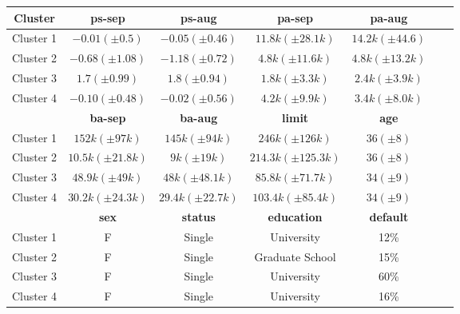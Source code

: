 \begin{center}
\begin{tabular}{c|c|c|c|c|c|c}
	\hline
	\textbf{Cluster} & \textbf{ps-sep} 
	& \textbf{ps-aug} & \textbf{pa-sep} 
	& \textbf{pa-aug}\\
	\hline
	Cluster 1 & 
	$ -0.01 (\pm 0.5)$ & 
	$ -0.05 (\pm 0.46)$ &
	$11.8k (\pm 28.1k)$ &
	$14.2k (\pm 44.6)$\\
	\hline
	Cluster 2 & 
	$-0.68 (\pm 1.08)$ & 
	$-1.18 (\pm 0.72)$ &
	$4.8k (\pm 11.6k)$ &
	$4.8k (\pm 13.2k)$\\
	\hline
	Cluster 3 & 
	$1.7 (\pm 0.99)$ & 
	$1.8 (\pm 0.94)$ &
	$1.8k (\pm 3.3k)$ &
	$2.4k (\pm 3.9k)$\\
	\hline
	Cluster 4 & 
	$-0.10 (\pm 0.48)$ & 
	$-0.02 (\pm 0.56)$ &
	$4.2k (\pm 9.9k)$ &
	$3.4k (\pm 8.0k)$\\
	\hline
	& 
	\textbf{ba-sep} & 
	\textbf{ba-aug} & 
	\textbf{limit} & 
	\textbf{age} &\\
	\hline
	Cluster 1 & 
	$152k (\pm 97k)$ &
	$145k (\pm 94k)$ &
	$246k (\pm 126k)$ &
	$36 (\pm 8)$\\
	\hline
	Cluster 2 &
	$10.5k (\pm 21.8k)$ &
	$9k (\pm 19k)$ &
	$214.3k (\pm 125.3k)$ &
	$36 (\pm 8)$\\
	\hline
	Cluster 3 &
	$48.9k (\pm 49k)$ &
	$48k (\pm 48.1k)$ &
	$85.8k (\pm 71.7k)$ &
	$34 (\pm 9)$\\
	\hline
	Cluster 4 &
	$30.2k (\pm 24.3k)$ &
	$29.4k (\pm 22.7k)$ &
	$103.4k (\pm 85.4k)$ &
	$34 (\pm 9)$\\
	\hline
	& 
	\textbf{sex} & 
	\textbf{status} & 
	\textbf{education} & 
	\textbf{default}\\
	\hline
	Cluster 1 & 
	F &
	Single &
	University&
	12\%\\
	\hline
	Cluster 2 & 
	F &
	Single &
	Graduate School&
	15\%\\
	\hline
	Cluster 3 & 
	F &
	Single &
	University&
	60\%\\
	\hline
	Cluster 4 & 
	F &
	Single &
	University&
	16\%\\
	\hline
\end{tabular}
\end{center}

